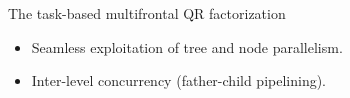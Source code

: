 \begin{frame}[fragile,t]{The task-based multifrontal QR factorization}
\vspace{0.5cm}

\begin{itemize}
\item Seamless exploitation of tree and node parallelism.
\item \alert{Inter-level concurrency} (father-child pipelining).
\end{itemize}

\vspace{0.2cm}


\end{frame}


